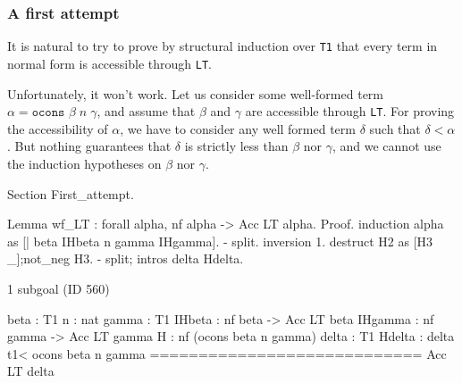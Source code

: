 
  

 




\subsubsection{A first attempt}
\label{sec:orgheadline77}

It is natural to try to prove by structural induction over \texttt{T1} 
that every term in normal form is accessible through \texttt{LT}.

Unfortunately, it won't work. Let us consider some well-formed term
 $\alpha=\texttt{ocons $\beta\;n\;\gamma$}$, and assume that \(\beta\) and \(\gamma\) are accessible
 through \texttt{LT}. For proving the accessibility of $\alpha$, we have to consider
any well formed term \(\delta\) such that \(\delta<\alpha\). 
But nothing guarantees that \(\delta\)  is strictly  less than \(\beta\) nor \(\gamma\), and we cannot use the induction hypotheses on   \(\beta\) nor \(\gamma\).

\begin{Coqbad}
Section First_attempt.

 Lemma wf_LT : forall alpha,  nf alpha -> Acc LT alpha. 
 Proof.
  induction alpha as [| beta IHbeta n gamma IHgamma].
  - split.
    inversion 1.
    destruct H2 as [H3 _];not_neg H3.
  -  split; intros delta Hdelta.
\end{Coqbad}

\begin{Coqanswer}
1 subgoal (ID 560)
  
  beta : T1
  n : nat
  gamma : T1
  IHbeta : nf beta -> Acc LT beta
  IHgamma : nf gamma -> Acc LT gamma
  H : nf (ocons beta n gamma)
  delta : T1
  Hdelta : delta t1< ocons beta n gamma
  ============================
  Acc LT delta
 \end{Coqanswer}

